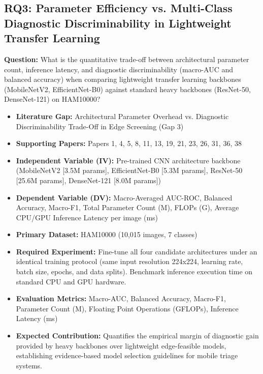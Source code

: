 \documentclass[11pt,a4paper]{article}
\begin{document}
\subsection{RQ3: Parameter Efficiency vs. Multi-Class Diagnostic Discriminability in Lightweight Transfer Learning}
\textbf{Question:} What is the quantitative trade-off between architectural parameter count, inference latency, and diagnostic discriminability (macro-AUC and balanced accuracy) when comparing lightweight transfer learning backbones (MobileNetV2, EfficientNet-B0) against standard heavy backbones (ResNet-50, DenseNet-121) on HAM10000?
\begin{itemize}
\item \textbf{Literature Gap:} Architectural Parameter Overhead vs. Diagnostic Discriminability Trade-Off in Edge Screening (Gap 3)
\item \textbf{Supporting Papers:} Papers 1, 4, 5, 8, 11, 13, 19, 21, 23, 26, 31, 36, 38
\item \textbf{Independent Variable (IV):} Pre-trained CNN architecture backbone (MobileNetV2 [3.5M params], EfficientNet-B0 [5.3M params], ResNet-50 [25.6M params], DenseNet-121 [8.0M params])
\item \textbf{Dependent Variable (DV):} Macro-Averaged AUC-ROC, Balanced Accuracy, Macro-F1, Total Parameter Count (M), FLOPs (G), Average CPU/GPU Inference Latency per image (ms)
\item \textbf{Primary Dataset:} HAM10000 (10,015 images, 7 classes)
\item \textbf{Required Experiment:} Fine-tune all four candidate architectures under an identical training protocol (same input resolution 224x224, learning rate, batch size, epochs, and data splits). Benchmark inference execution time on standard CPU and GPU hardware.
\item \textbf{Evaluation Metrics:} Macro-AUC, Balanced Accuracy, Macro-F1, Parameter Count (M), Floating Point Operations (GFLOPs), Inference Latency (ms)
\item \textbf{Expected Contribution:} Quantifies the empirical margin of diagnostic gain provided by heavy backbones over lightweight edge-feasible models, establishing evidence-based model selection guidelines for mobile triage systems.
\end{itemize}
\end{document}
